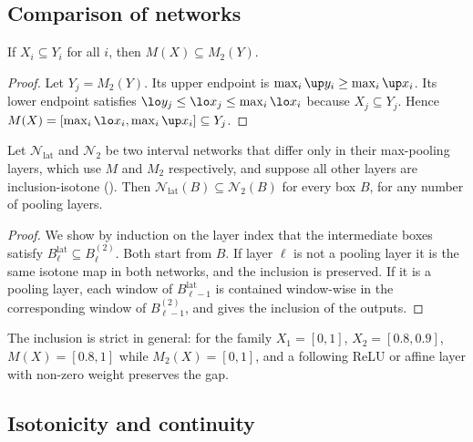 \subsection{Comparison of networks}

\begin{lemma}\label{lem:mixed}
If $X_i\subseteq Y_i$ for all $i$, then $M(X)\subseteq M_2(Y)$.
\end{lemma}

\begin{proof}
Let $Y_j=M_2(Y)$. Its upper endpoint is $\max_i\up y_i\ge\max_i\up x_i$. Its lower endpoint satisfies $\lo y_j\le\lo x_j\le\max_i\lo x_i$ because $X_j\subseteq Y_j$. Hence $M(X)=[\max_i\lo x_i,\max_i\up x_i]\subseteq Y_j$.
\end{proof}

\begin{theorem}\label{thm:compare}
Let $\mathcal N_{\mathrm{lat}}$ and $\mathcal N_2$ be two interval networks that differ only in their max-pooling layers, which use $M$ and $M_2$ respectively, and suppose all other layers are inclusion-isotone (). Then $\mathcal N_{\mathrm{lat}}(B)\subseteq\mathcal N_2(B)$ for every box $B$, for any number of pooling layers.
\end{theorem}

\begin{proof}
We show by induction on the layer index that the intermediate boxes satisfy $B^{\mathrm{lat}}_\ell\subseteq B^{(2)}_\ell$. Both start from $B$. If layer $\ell$ is not a pooling layer it is the same isotone map in both networks, and the inclusion is preserved. If it is a pooling layer, each window of $B^{\mathrm{lat}}_{\ell-1}$ is contained window-wise in the corresponding window of $B^{(2)}_{\ell-1}$, and  gives the inclusion of the outputs.
\end{proof}

\begin{example}\label{ex:strict}
The inclusion is strict in general: for the family $X_1=[0,1]$, $X_2=[0.8,0.9]$, $M(X)=[0.8,1]$ while $M_2(X)=[0,1]$, and a following ReLU or affine layer with non-zero weight preserves the gap.
\end{example}

\subsection{Isotonicity and continuity}

